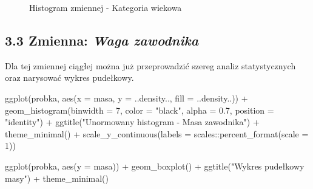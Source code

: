 \documentclass[
  letterpaper,
  DIV=11,
  numbers=noendperiod]{scrartcl}
\newenvironment{Shaded}{\begin{snugshade}}{\end{snugshade}}
\newcommand{\AttributeTok}[1]{\textcolor[rgb]{0.40,0.45,0.13}{#1}}
\newcommand{\DecValTok}[1]{\textcolor[rgb]{0.68,0.00,0.00}{#1}}
\newcommand{\FloatTok}[1]{\textcolor[rgb]{0.68,0.00,0.00}{#1}}
\newcommand{\FunctionTok}[1]{\textcolor[rgb]{0.28,0.35,0.67}{#1}}
\newcommand{\NormalTok}[1]{\textcolor[rgb]{0.00,0.23,0.31}{#1}}
\newcommand{\SpecialCharTok}[1]{\textcolor[rgb]{0.37,0.37,0.37}{#1}}
\newcommand{\StringTok}[1]{\textcolor[rgb]{0.13,0.47,0.30}{#1}}
\begin{document}
\begin{figure}
\begin{minipage}[t]{0.50\linewidth}
{}

\end{minipage}%
\newline
\begin{minipage}[t]{0.50\linewidth}

{\centering 

Histogram zmiennej - Kategoria wiekowa

}

\end{minipage}%

\end{figure}

\hypertarget{zmienna-waga-zawodnika}{%
\subsection{\texorpdfstring{3.3 Zmienna: \emph{Waga
zawodnika}}{3.3 Zmienna: Waga zawodnika}}\label{zmienna-waga-zawodnika}}

Dla tej zmiennej ciągłej można już przeprowadzić szereg analiz
statystycznych oraz narysować wykres pudełkowy.

\begin{Shaded}
\begin{Highlighting}[]
\FunctionTok{ggplot}\NormalTok{(probka, }\FunctionTok{aes}\NormalTok{(}\AttributeTok{x =}\NormalTok{ masa, }\AttributeTok{y =}\NormalTok{ ..density.., }\AttributeTok{fill =}\NormalTok{ ..density..)) }\SpecialCharTok{+}
  \FunctionTok{geom\_histogram}\NormalTok{(}\AttributeTok{binwidth =} \DecValTok{7}\NormalTok{, }\AttributeTok{color =} \StringTok{"black"}\NormalTok{, }\AttributeTok{alpha =} \FloatTok{0.7}\NormalTok{, }\AttributeTok{position =} \StringTok{"identity"}\NormalTok{) }\SpecialCharTok{+}
  \FunctionTok{ggtitle}\NormalTok{(}\StringTok{"Unormowany histogram {-} Masa zawodnika"}\NormalTok{) }\SpecialCharTok{+}
  \FunctionTok{theme\_minimal}\NormalTok{() }\SpecialCharTok{+}
  \FunctionTok{scale\_y\_continuous}\NormalTok{(}\AttributeTok{labels =}\NormalTok{ scales}\SpecialCharTok{::}\FunctionTok{percent\_format}\NormalTok{(}\AttributeTok{scale =} \DecValTok{1}\NormalTok{))}

\FunctionTok{ggplot}\NormalTok{(probka, }\FunctionTok{aes}\NormalTok{(}\AttributeTok{y =}\NormalTok{ masa)) }\SpecialCharTok{+}
  \FunctionTok{geom\_boxplot}\NormalTok{() }\SpecialCharTok{+}
  \FunctionTok{ggtitle}\NormalTok{(}\StringTok{"Wykres pudełkowy masy"}\NormalTok{) }\SpecialCharTok{+}
  \FunctionTok{theme\_minimal}\NormalTok{()}
\end{Highlighting}
\end{Shaded}
\end{document}
